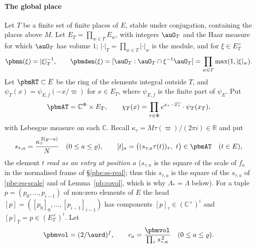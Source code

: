 \documentclass[10pt]{amsart}
\theoremstyle{definition}
\theoremstyle{remark}
\newcommand{\C}{\mathbb C}
\newcommand{\R}{\mathbb R}
\providecommand{\auPl}{\Phi}
\providecommand{\aubar}[1]{\overline{#1}}
\begin{document}
\paragraph*{The global place}
Let $T$ be a finite set of finite places of $E$, stable under conjugation, containing the places
above $M$. Let $E_T=\prod_{w\in T}E_w$, with integers $\auO_T$ and the Haar measure for which
$\auO_T$ has volume $1$; $|\cdot|_T=\prod_{w\in T}|\cdot|_w$ is the module, and for $\xi\in E_T^\times$
\[
\pbmn(\xi)=|\xi|_T^{-1},\qquad\pbmden(\xi)=[\auO_T:\auO_T\cap\xi^{-1}\auO_T]=\prod_{w\in T}\max(1,|\xi|_w).
\]
Let $\pbmRT\subset E$ be the ring of the elements integral outside $T$, and $\psi_T(x)=\psi_{E,f}(-x/
\varpi)$ for $x\in E_T$, where $\psi_{E,f}$ is the finite part of $\psi_E$. Put
\[
\pbmAT=\C^{\auPl}\times E_T,\qquad\chi_T(x)=\prod_{\tau\in\auPl}e^{x_\tau-\aubar{x_\tau}}\cdot\psi_T(x_T),
\]
with Lebesgue measure on each $\C$. Recall $\kappa_\tau=M\tau(\varpi)/(2\pi i)\in\R$ and put
\begin{equation}\label{pbm:eq-scales}
s_{\tau,a}=\frac{\kappa_\tau^{\,2(\varrho-a)}}N\quad(0\le a\le\varrho),\qquad[t]_a=\bigl((s_{\tau,a}\tau(
t))_\tau,\ t\bigr)\in\pbmAT\quad(t\in E),
\end{equation}
the element $t$ \emph{read as an entry at position $a$} ($s_{\tau,a}$ is the square of the scale of
$f_a$ in the normalised frame of \S\ref{pbe:ss-real}; thus this $s_{\tau,a}$ is the square of the $s_{\tau,a}$ of \eqref{pbe:eq-scale} and of Lemma~\ref{pb:covol}, which is why $\Lambda_*=\Lambda$ below). For a tuple $p=(p_0,\dots,p_{i-1})$ of
non-zero elements of $E$ the head $[p]=([p_0]_0,\dots,[p_{i-1}]_{i-1})$ has components $[p]_\tau\in
(\C^\times)^i$ and $[p]_T=p\in(E_T^\times)^i$. Let
\[
\pbmvol=(2/\aurd)^f,\qquad c_a=\frac{\pbmvol}{\prod_\tau s_{\tau,a}^{\,2}}\quad(0\le a\le\varrho).
\]
\end{document}
